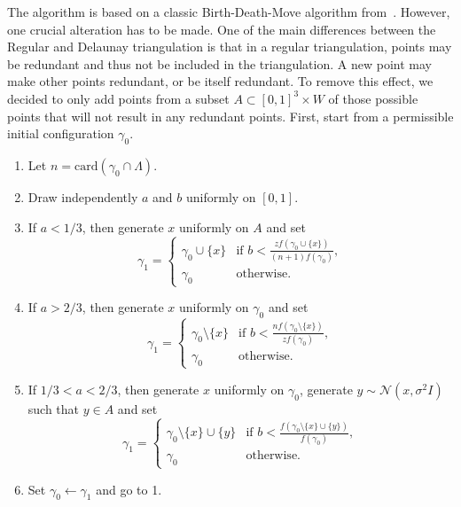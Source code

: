 \documentclass[12pt,a4paper]{report}
\begin{document}
The algorithm is based on a classic  Birth-Death-Move algorithm from~\cite{moller-waagepetersen:2003}. However, one crucial alteration has to be made. One of the main differences between the Regular and Delaunay triangulation is that in a regular triangulation, points may be redundant and thus not be included in the triangulation. A new point may make other points redundant, or be itself redundant. To remove this effect,  we decided to only add points from a subset $A \subset [0,1]^3\times W$ of those possible points that will not result in any redundant points. \newline
First, start from a permissible initial configuration $\gamma_0$.
\begin{enumerate}
    \item Let $n = \text{card}(\gamma_0 \cap \Lambda)$.
    \item Draw independently $a$ and $b$ uniformly on $[0,1]$.
    \item If $a<1/3$, then generate $x$ uniformly on $A$ and set
        \begin{equation}\label{birth}
        \gamma_1 = 
        \left\{
            \begin{array}{ll}
                \gamma_0 \cup \{x\} & \mbox{if }  b < \frac{z f(\gamma_0 \cup \{x\})}{(n+1)f(\gamma_0)}, \\
                \gamma_0 & \mbox{otherwise. }
            \end{array}
        \right. 
        \end{equation}
    \item If $a>2/3$, then generate $x$ uniformly on $\gamma_0$ and set
        \begin{equation}\label{death}
        \gamma_1 = 
        \left\{
            \begin{array}{ll}
                \gamma_0 \setminus \{x\} & \mbox{if }  b < \frac{n f(\gamma_0 \setminus \{x\})}{zf(\gamma_0)}, \\
                \gamma_0 & \mbox{otherwise. }
            \end{array}
        \right. 
        \end{equation}
    \item If $1/3 < a < 2/3$, then generate $x$ uniformly on $\gamma_0$, generate $y\sim \mathcal N (x, \sigma^2 I)$ such that $y \in A$ and set
        \begin{equation}\label{move}
        \gamma_1 = 
        \left\{
            \begin{array}{ll}
                \gamma_0 \setminus \{x\} \cup \{y\} & \mbox{if }  b < \frac{f(\gamma_0 \setminus \{x\} \cup \{y\})}{f(\gamma_0)}, \\
                \gamma_0 & \mbox{otherwise. }
            \end{array}
        \right. 
        \end{equation}
    \item Set $\gamma_0 \leftarrow \gamma_1$ and go to 1.
\end{enumerate}
\end{document}
